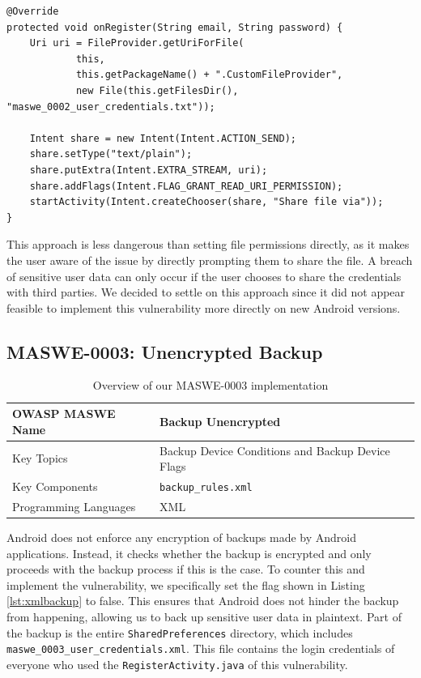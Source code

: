 \begin{lstlisting}[style=JavaStyle, float=tbh, mathescape=true, captionpos=b, caption={Prompting the user to share a plaintext file containing user credentials}, label=lst:Maswe0002PromptingUserShareCredentials]
@Override
protected void onRegister(String email, String password) {
    Uri uri = FileProvider.getUriForFile(
            this,
            this.getPackageName() + ".CustomFileProvider",
            new File(this.getFilesDir(), "maswe_0002_user_credentials.txt"));

    Intent share = new Intent(Intent.ACTION_SEND);
    share.setType("text/plain");
    share.putExtra(Intent.EXTRA_STREAM, uri);
    share.addFlags(Intent.FLAG_GRANT_READ_URI_PERMISSION);
    startActivity(Intent.createChooser(share, "Share file via"));
}
\end{lstlisting}

This approach is less dangerous than setting file permissions directly, as it makes the user aware of the issue by directly prompting them to share the file. A breach of sensitive user data can only occur if the user chooses to share the credentials with third parties. We decided to settle on this approach since it did not appear feasible to implement this vulnerability more directly on new Android versions.

\subsection{MASWE-0003: Unencrypted Backup}

\begin{table}[H]
\centering
\renewcommand{\arraystretch}{1.3}
\begin{tabular}{p{5cm} p{8cm}}
\toprule
OWASP MASWE Name & Backup Unencrypted \\
\midrule
Key Topics & Backup Device Conditions and Backup Device Flags \\
Key Components & \texttt{backup\_rules.xml} \\
Programming Languages & XML \\
\bottomrule
\end{tabular}
\caption{Overview of our MASWE-0003 implementation}
\label{tab:maswe-0003}
\end{table}

Android does not enforce any encryption of backups made by Android applications. Instead, it checks whether the backup is encrypted and only proceeds with the backup process if this is the case. To counter this and implement the vulnerability, we specifically set the flag shown in Listing \ref{lst:xmlbackup} to false. This ensures that Android does not hinder the backup from happening, allowing us to back up sensitive user data in plaintext. Part of the backup is the entire \texttt{SharedPreferences} directory, which includes \texttt{maswe\_0003\_user\_credentials.xml}. This file contains the login credentials of everyone who used the \texttt{RegisterActivity.java} of this vulnerability.

